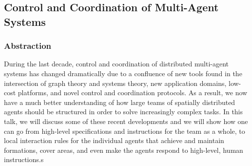 \documentclass[9pt, english, a4paper]{article}
\theoremstyle{definition}
\begin{document}
\subsection{Control and Coordination of Multi-Agent Systems}
	\subsubsection{Abstraction}
		During the last decade, control and coordination of distributed multi-agent systems has changed dramatically due to a confluence of new tools found in the intersection of graph theory and systems theory, new application domains, low-cost platforms, and novel control and coordination protocols. As a result, we now have a much better understanding of how large teams of spatially distributed agents should be structured in order to solve increasingly complex tasks. In this talk, we will discuss some of these recent developments and we will show how one can go from high-level specifications and instructions for the team as a whole, to local interaction rules for the individual agents that achieve and maintain formations, cover areas, and even make the agents respond to high-level, human instructions.s
\end{document}
